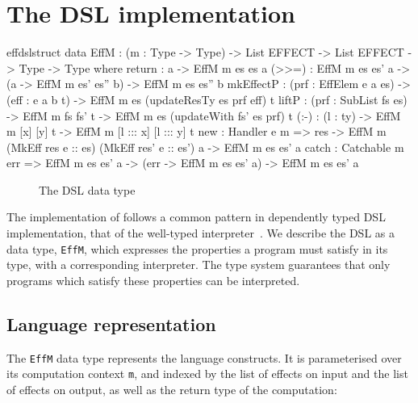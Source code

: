 \section{The \Eff{} DSL implementation}

\label{sect:effimpl}

\begin{SaveVerbatim}{effdslstruct}
data EffM : (m : Type -> Type) -> List EFFECT -> List EFFECT -> Type -> Type where
     return    : a -> EffM m es es a
     (>>=)     : EffM m es es' a -> (a -> EffM m es' es'' b) -> EffM m es es'' b
     mkEffectP : (prf : EffElem e a es) -> (eff : e a b t) -> EffM m es (updateResTy es prf eff) t
     liftP     : (prf : SubList fs es) -> EffM m fs fs' t -> EffM m es (updateWith fs' es prf) t
     (:-)      : (l : ty) -> EffM m [x] [y] t -> EffM m [l ::: x] [l ::: y] t
     new       : Handler e m => res -> EffM m (MkEff res e :: es) (MkEff res' e :: es') a -> EffM m es es' a
     catch     : Catchable m err => EffM m es es' a -> (err -> EffM m es es' a) -> EffM m es es' a
\end{SaveVerbatim}

\begin{figure*}[t]
\begin{center}
\end{center}
\caption{The \Eff{} DSL data type}
\label{effdsltype}
\end{figure*}

The implementation of \Eff{} follows a common pattern in dependently typed DSL
implementation, that of the well-typed
interpreter~\cite{augustsson1999exercise,Brady2006a,Pasalic2002}. We describe
the DSL as a data type, \texttt{EffM}, which expresses the properties a program
must satisfy in its type, with a corresponding interpreter. The type system
guarantees that only programs which satisfy these properties 
can be interpreted.

\subsection{Language representation}


The \texttt{EffM} data type represents the \Eff{} language constructs.
It is parameterised over its computation context \texttt{m},
and indexed by the list of effects on input and the list of effects on output,
as well as the return type of the computation:

